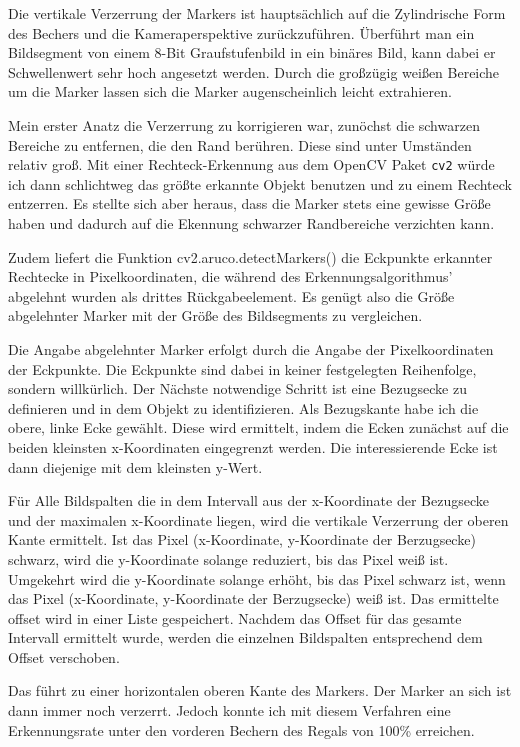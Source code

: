     Die vertikale Verzerrung der Markers ist hauptsächlich auf die Zylindrische Form des Bechers und die Kameraperspektive zurückzuführen. 
    Überführt man ein Bildsegment von einem 8-Bit Graufstufenbild in ein binäres Bild, kann dabei er Schwellenwert sehr hoch angesetzt werden. 
    Durch die großzügig weißen Bereiche um die Marker lassen sich die Marker augenscheinlich leicht extrahieren. 
    
    Mein erster Anatz die Verzerrung zu korrigieren war, zunöchst die schwarzen Bereiche zu entfernen, die den Rand berühren. Diese sind unter Umständen relativ groß. 
    Mit einer Rechteck-Erkennung aus dem OpenCV Paket \verb|cv2| würde ich dann schlichtweg das größte erkannte Objekt benutzen und zu einem Rechteck entzerren.
    Es stellte sich aber heraus, dass die Marker stets eine gewisse Größe haben und dadurch auf die Ekennung schwarzer Randbereiche verzichten kann. 

    Zudem liefert die Funktion cv2.aruco.detectMarkers() die Eckpunkte erkannter Rechtecke in Pixelkoordinaten, die während des Erkennungsalgorithmus' abgelehnt wurden als drittes Rückgabeelement. 
    Es genügt also die Größe abgelehnter Marker mit der Größe des Bildsegments zu vergleichen. 

    Die Angabe abgelehnter Marker erfolgt durch die Angabe der Pixelkoordinaten der Eckpunkte. Die Eckpunkte sind dabei in keiner festgelegten Reihenfolge, sondern willkürlich. 
    Der Nächste notwendige Schritt ist eine Bezugsecke zu definieren und in dem Objekt zu identifizieren. Als Bezugskante habe ich die obere, linke Ecke gewählt. 
    Diese wird ermittelt, indem die Ecken zunächst auf die beiden kleinsten x-Koordinaten eingegrenzt werden. Die interessierende Ecke ist dann diejenige mit dem kleinsten y-Wert.
    
    Für Alle Bildspalten die in dem Intervall aus der x-Koordinate der Bezugsecke und der maximalen x-Koordinate liegen, wird die vertikale Verzerrung der oberen Kante ermittelt.
    Ist das Pixel (x-Koordinate, y-Koordinate der Berzugsecke) schwarz, wird die y-Koordinate solange reduziert, bis das Pixel weiß ist.
    Umgekehrt wird die y-Koordinate solange erhöht, bis das Pixel schwarz ist, wenn das Pixel (x-Koordinate, y-Koordinate der Berzugsecke) weiß ist.
    Das ermittelte offset wird in einer Liste gespeichert. 
    Nachdem das Offset für das gesamte Intervall ermittelt wurde, werden die einzelnen Bildspalten entsprechend dem Offset verschoben.

    Das führt zu einer horizontalen oberen Kante des Markers. Der Marker an sich ist dann immer noch verzerrt.
    Jedoch konnte ich mit diesem Verfahren eine Erkennungsrate unter den vorderen Bechern des Regals von 100\% erreichen.


